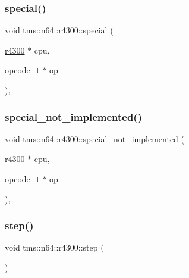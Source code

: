 \mbox{\label{classtms_1_1n64_1_1r4300_a6f8325fa6b989a84f2bc1f65aa26f2e5}} 
\subsubsection{\texorpdfstring{special()}{special()}}
{\footnotesize\ttfamily void tms\+::n64\+::r4300\+::special (\begin{DoxyParamCaption}\item[{\hyperlink{classtms_1_1n64_1_1r4300}{r4300} $\ast$}]{cpu,  }\item[{\hyperlink{classtms_1_1n64_1_1opcode__t}{opcode\+\_\+t} $\ast$}]{op }\end{DoxyParamCaption})\hspace{0.3cm}{\ttfamily [static]}, {\ttfamily [private]}}

\mbox{\label{classtms_1_1n64_1_1r4300_a4e5f2d030d7084f739e832cba2a1bf07}} 
\subsubsection{\texorpdfstring{special\+\_\+not\+\_\+implemented()}{special\_not\_implemented()}}
{\footnotesize\ttfamily void tms\+::n64\+::r4300\+::special\+\_\+not\+\_\+implemented (\begin{DoxyParamCaption}\item[{\hyperlink{classtms_1_1n64_1_1r4300}{r4300} $\ast$}]{cpu,  }\item[{\hyperlink{classtms_1_1n64_1_1opcode__t}{opcode\+\_\+t} $\ast$}]{op }\end{DoxyParamCaption})\hspace{0.3cm}{\ttfamily [static]}, {\ttfamily [private]}}

\mbox{\label{classtms_1_1n64_1_1r4300_aa683dd9de43d88b556a4c0c31a3326bf}} 
\subsubsection{\texorpdfstring{step()}{step()}}
{\footnotesize\ttfamily void tms\+::n64\+::r4300\+::step (\begin{DoxyParamCaption}{ }\end{DoxyParamCaption})}

